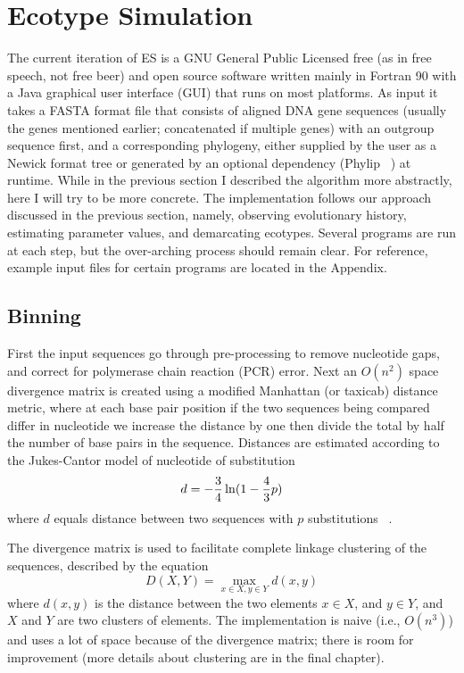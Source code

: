 \section{Ecotype Simulation}
%
%
The current iteration of ES is a GNU General Public Licensed free (as in free speech, not free beer) and open source software written mainly in Fortran 90 with a Java graphical user interface (GUI) that runs on most platforms.
As input it takes a FASTA format file that consists of aligned DNA gene sequences (usually the genes mentioned earlier; concatenated if multiple genes) with an outgroup sequence first, and a corresponding phylogeny, either supplied by the user as a Newick format tree or generated by an optional dependency (Phylip ~\cite{felsenstein1989phylip}) at runtime.
While in the previous section I described the algorithm more abstractly, here I will try to be more concrete.
The implementation follows our approach discussed in the previous section, namely, observing evolutionary history, estimating parameter values, and demarcating ecotypes.
Several programs are run at each step, but the over-arching process should remain clear.
For reference, example input files for certain programs are located in the Appendix.

\subsection*{Binning}
First the input sequences go through pre-processing to remove nucleotide gaps, and correct for polymerase chain reaction (PCR) error.
Next an $O(n^2)$ space divergence matrix is created using a modified Manhattan (or taxicab) distance metric, where at each base pair position if the two sequences being compared differ in nucleotide we increase the distance by one then divide the total by half the number of base pairs in the sequence.
Distances are estimated according to the Jukes-Cantor model of nucleotide of substitution$$d=-{3\over4} \ln({1-{4\over3}p})$$where $d$ equals distance between two sequences with $p$ substitutions ~\cite{jukes1969evolution}.

The divergence matrix is used to facilitate complete linkage clustering of the sequences, described by the equation $$D(X,Y)= \max_{x\in X, y\in Y} d(x,y)$$ where $d(x,y)$ is the distance between the two elements $x \in X$, and $y \in Y$, and $X$ and $Y$ are two clusters of elements.
The implementation is naive (i.e., $O(n^3)$) and uses a lot of space because of the divergence matrix; there is room for improvement (more details about clustering are in the final chapter). 

